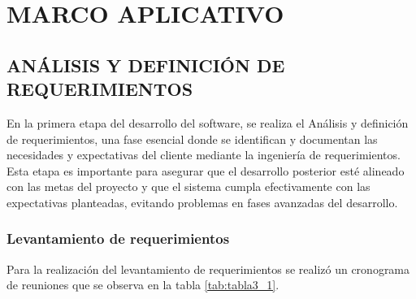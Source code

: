 \chapter{MARCO APLICATIVO}
\section{ANÁLISIS Y DEFINICIÓN DE REQUERIMIENTOS}
	En la primera etapa del desarrollo del software, se realiza el Análisis y definición de requerimientos, una fase esencial donde se identifican y documentan las necesidades y expectativas del cliente mediante la ingeniería de requerimientos. Esta etapa es importante para asegurar que el desarrollo posterior esté alineado con las metas del proyecto y que el sistema cumpla efectivamente con las expectativas planteadas, evitando problemas en fases avanzadas del desarrollo.
	
	\subsection{Levantamiento de requerimientos}
	Para la realización del levantamiento de requerimientos se realizó un cronograma de reuniones que se observa en la tabla \ref*{tab:tabla3_1}.
	\vspace{-1pt}  %
	
